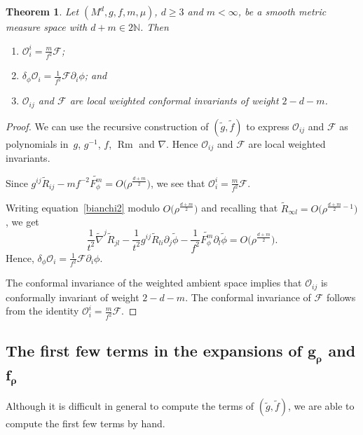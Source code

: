 \documentclass[pdftex]{sigma}
\numberwithin{equation}{section}
\newtheorem{Theorem}{Theorem}[section]
\begin{document}
\begin{Theorem}
\label{obstruction-theorem}
Let $(M^d,g,f,m,\mu)$, $d\geq 3$ and $m<\infty$, be a smooth metric measure space with $d+m\in 2\mathbb{N}$. Then
\begin{enumerate}[label=$(\roman*)$]\itemsep=0pt
\item $\mathcal{O}_i^i=\frac{m}{f^2}\mathcal{F}$;
\item $\delta_\phi\mathcal{O}_{i}=\frac{1}{f^2}\mathcal{F}\partial_i\phi$; and
\item $\mathcal{O}_{ij}$ and $\mathcal{F}$ are local weighted conformal invariants of weight $2-d-m$.
\end{enumerate}
\end{Theorem}

\begin{proof}
We can use the recursive construction of $(\widetilde{g},\widetilde{f})$ to express $\mathcal{O}_{ij}$ and $\mathcal{F}$ as polynomials in~$g$, $g^{-1}$, $f$, $\operatorname{Rm}$ and $\nabla$.
Hence $\mathcal{O}_{ij}$ and $\mathcal{F}$ are local weighted invariants.

Since $g^{ij}\widetilde{R}_{ij}-mf^{-2}\widetilde{F_\phi^m}=O\big(\rho^{\frac{d+m}{2}}\big)$, we see that $\mathcal{O}^i_i=\frac{m}{f^2}\mathcal{F}$.

Writing equation~\eqref{bianchi2} modulo $O\big(\rho^{\frac{d+m}{2}}\big)$ and recalling that $\widetilde{R}_{\infty l}=O\big(\rho^{\frac{d+m}{2}-1}\big)$, we get
\[
\frac{1}{t^2}\widetilde{\nabla}^j \widetilde{R}_{jl}-\frac{1}{t^2}g^{ij}\widetilde{R}_{li}\partial_j \widetilde{\phi}-\frac{1}{f^2}\widetilde{F_\phi^m}\partial_l \widetilde{\phi}=O\big(\rho^{\frac{d+m}{2}}\big).
\]
Hence, $\delta_\phi\mathcal{O}_{i}=\frac{1}{f^2}\mathcal{F}\partial_i\phi$.

The conformal invariance of the weighted ambient space implies that $\mathcal{O}_{ij}$ is conformally invari\-ant of weight $2-d-m$. The conformal invariance of $\mathcal{F}$ follows from the identity ${\mathcal{O}_i^i=\frac{m}{f^2}\mathcal{F}}$.
\end{proof}

\subsection[The first few terms in the expansions of g\_\{rho\} and f\_\{rho\}]{The first few terms in the expansions of $\boldsymbol{g_\rho}$ and $\boldsymbol {f_\rho}$}
\label{sec:low-order-expansion}

Although it is difficult in general to compute the terms of $(\widetilde{g},\widetilde{f})$, we are able to compute the first few terms by hand.
\end{document}
